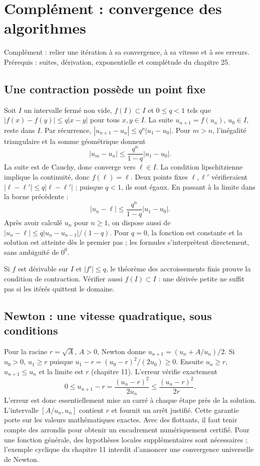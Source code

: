 \documentclass[../cours_1re.tex]{subfiles}
\begin{document}
\setcounter{chapter}{28}
\chapter{Complément : convergence des algorithmes}
\label{ch:29}
\begin{objectif}
Complément : relier une itération à sa convergence, à sa vitesse et à ses erreurs.
Prérequis : suites, dérivation, exponentielle et complétude du chapitre 25.
\end{objectif}
\section{Une contraction possède un point fixe}
Soit $I$ un intervalle fermé non vide, $f(I)\subset I$ et $0\le q<1$ tels que
$|f(x)-f(y)|\le q|x-y|$ pour tous $x,y\in I$.
La suite $u_{n+1}=f(u_n)$, $u_0\in I$, reste dans $I$.
Par récurrence, $|u_{n+1}-u_n|\le q^n|u_1-u_0|$.
Pour $m>n$, l'inégalité triangulaire et la somme géométrique donnent
\[
|u_m-u_n|\le\frac{q^n}{1-q}|u_1-u_0|.
\]
La suite est de Cauchy, donc converge vers $\ell\in I$.
La condition lipschitzienne implique la continuité, donc $f(\ell)=\ell$.
Deux points fixes $\ell,\ell'$ vérifieraient
$|\ell-\ell'|\le q|\ell-\ell'|$ ; puisque $q<1$, ils sont égaux.
En passant à la limite dans la borne précédente :
\[
|u_n-\ell|\le\frac{q^n}{1-q}|u_1-u_0|.
\]
Après avoir calculé $u_n$ pour $n\ge1$, on dispose aussi de
$|u_n-\ell|\le q|u_n-u_{n-1}|/(1-q)$.
Pour $q=0$, la fonction est constante et la solution est atteinte dès le
premier pas ; les formules s'interprètent directement, sans ambiguïté de $0^0$.

Si $f$ est dérivable sur $I$ et $|f'|\le q$, le théorème des accroissements
finis prouve la condition de contraction. Vérifier aussi $f(I)\subset I$ :
une dérivée petite ne suffit pas si les itérés quittent le domaine.

\section{Newton : une vitesse quadratique, sous conditions}
Pour la racine $r=\sqrt A$, $A>0$, Newton donne
$u_{n+1}=(u_n+A/u_n)/2$. Si $u_0>0$, $u_1\ge r$ puisque
$u_1-r=(u_0-r)^2/(2u_0)\ge0$.
Ensuite $u_n\ge r$, $u_{n+1}\le u_n$ et la limite est $r$
(chapitre 11). L'erreur vérifie exactement
\[
0\le u_{n+1}-r=\frac{(u_n-r)^2}{2u_n}
\le\frac{(u_n-r)^2}{2r}.
\]
L'erreur est donc essentiellement mise au carré à chaque étape près de la solution.
L'intervalle $[A/u_n,u_n]$ contient $r$ et fournit un arrêt justifié.
Cette garantie porte sur les valeurs mathématiques exactes. Avec des flottants,
il faut tenir compte des arrondis pour obtenir un encadrement numériquement certifié.
Pour une fonction générale, des hypothèses locales supplémentaires sont
nécessaires ; l'exemple cyclique du chapitre 11 interdit d'annoncer
une convergence universelle de Newton.
\end{document}
